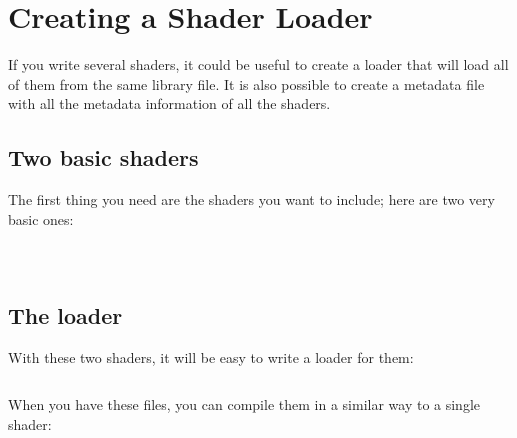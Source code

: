 \section{Creating a Shader Loader}


If you write several shaders, it could be useful to create a loader that will load all of them from the same library file.
It is also possible to create a metadata file with all the metadata information of all the shaders.

\subsection{Two basic shaders}

The first thing you need are the shaders you want to include; here are two very basic ones:

\inputminted[mathescape,
linenos,
numbersep=5pt,
frame=lines,
framesep=2mm,
baselinestretch=1,
fontsize=\footnotesize,
tabsize=3,
label=myShader1.cpp]
{c++}{myShader1.cpp}

$ $\\

\inputminted[mathescape,
linenos,
numbersep=5pt,
frame=lines,
framesep=2mm,
baselinestretch=1,
fontsize=\footnotesize,
tabsize=3,
label=myShader2.cpp]
{c++}{myShader2.cpp}

\subsection{The loader}

With these two shaders, it will be easy to write a loader for them:

\inputminted[mathescape,
linenos,
numbersep=5pt,
frame=lines,
framesep=2mm,
baselinestretch=1,
fontsize=\footnotesize,
tabsize=3,
label=loader.cpp]
{c++}{loader.cpp}

When you have these files, you can compile them in a similar way to a single shader:



